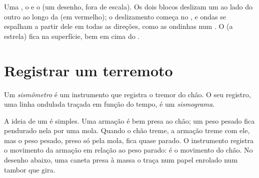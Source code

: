 \begin{omfigure}
{\small Uma , o  e o  (um desenho, fora de escala). Os
dois blocos deslizam um ao lado do outro ao longo da  (em vermelho);
o deslizamento começa no , e ondas se espalham a partir dele em todas
as direções, como as ondinhas num . O  (a estrela) fica na
superfície, bem em cima do .}
\label{fig:g7:earthquakes:fault}
\end{omfigure}


\section{Registrar um terremoto}

\begin{definition}\label{def:g7:earthquakes:seismometer}
Um \emph{sismômetro} é um instrumento que registra o
tremor do chão. O seu registro, uma linha ondulada traçada em função do
tempo, é um \emph{sismograma}.
\end{definition}

A ideia de um  é simples. Uma armação é bem presa ao chão; um
peso pesado fica pendurado nela por uma mola. Quando o chão treme, a
armação treme com ele, mas o peso pesado, preso só pela mola, fica quase
parado. O instrumento registra o movimento da armação em relação ao peso
parado: é o movimento do chão. No desenho abaixo, uma caneta presa à massa
o traça num papel enrolado num tambor que gira.

